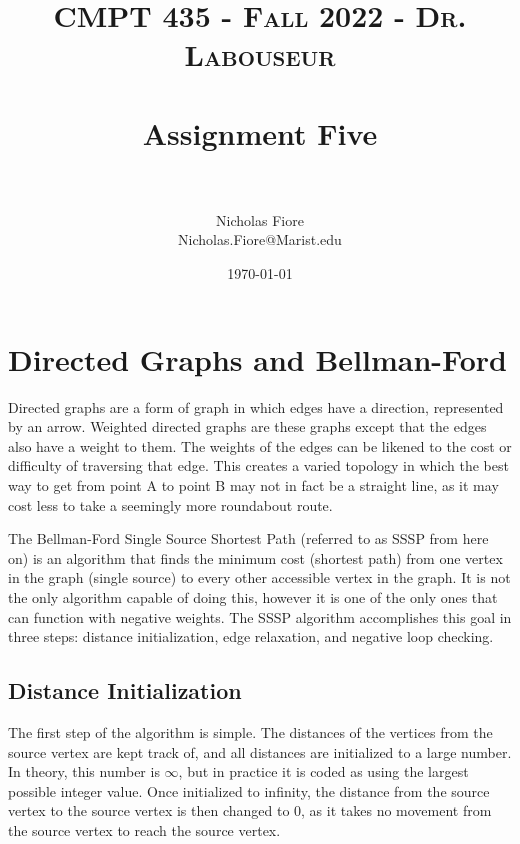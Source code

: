 \documentclass[letterpaper, 10pt,DIV=13]{scrartcl}
\title{	
   \normalfont \normalsize 
   \textsc{CMPT 435 - Fall 2022 - Dr. Labouseur} \\[10pt] %
   \horrule{0.5pt} \\[0.25cm] 	%
   \huge Assignment Five  \\     	    %
   \horrule{0.5pt} \\[0.25cm] 	%
}
\author{Nicholas Fiore \\ \normalsize Nicholas.Fiore@Marist.edu}
\date{\normalsize\today} 	%
\numberwithin{equation}{section} %
\numberwithin{figure}{section} %
\numberwithin{table}{section} %
\begin{document}
\maketitle %

\section{Directed Graphs and Bellman-Ford}
Directed graphs are a form of graph in which edges have a direction, represented by an arrow. Weighted directed graphs are these graphs except that the edges also have a weight to them. The weights of the edges can be likened to the cost or difficulty of traversing that edge. This creates a varied topology in which the best way to get from point A to point B may not in fact be a straight line, as it may cost less to take a seemingly more roundabout route.

The Bellman-Ford Single Source Shortest Path (referred to as SSSP from here on) is an algorithm that finds the minimum cost (shortest path) from one vertex in the graph (single source) to every other accessible vertex in the graph. It is not the only algorithm capable of doing this, however it is one of the only ones that can function with negative weights. The SSSP algorithm accomplishes this goal in three steps: distance initialization, edge relaxation, and negative loop checking.
\subsection{Distance Initialization}
The first step of the algorithm is simple. The distances of the vertices from the source vertex are kept track of, and all distances are initialized to a large number. In theory, this number is $\infty$, but in practice it is coded as using the largest possible integer value. Once initialized to infinity, the distance from the source vertex to the source vertex is then changed to 0, as it takes no movement from the source vertex to reach the source vertex.
\end{document}
